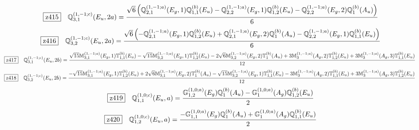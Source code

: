 \documentclass[fleqn,10pt,landscape]{jsarticle}
\begin{document}
\begin{dmath*}
\hspace*{3mm}\fbox{z415}\quad \mathbb{Q}_{3,1}^{(1,-1;c)}(E_{u},2a)=\frac{\sqrt{6} \left(\mathbb{Q}_{2,1}^{(1,-1;a)}(E_{g},1) \mathbb{Q}_{1,1}^{(b)}(E_{u}) - \mathbb{Q}_{2,2}^{(1,-1;a)}(E_{g},1) \mathbb{Q}_{1,2}^{(b)}(E_{u}) - \mathbb{Q}_{2,2}^{(1,-1;a)}(E_{g},2) \mathbb{Q}_{1}^{(b)}(A_{u})\right)}{6}
\end{dmath*}
\begin{dmath*}
\hspace*{3mm}\fbox{z416}\quad \mathbb{Q}_{3,2}^{(1,-1;c)}(E_{u},2a)=\frac{\sqrt{6} \left(- \mathbb{Q}_{2,1}^{(1,-1;a)}(E_{g},1) \mathbb{Q}_{1,2}^{(b)}(E_{u}) + \mathbb{Q}_{2,1}^{(1,-1;a)}(E_{g},2) \mathbb{Q}_{1}^{(b)}(A_{u}) - \mathbb{Q}_{2,2}^{(1,-1;a)}(E_{g},1) \mathbb{Q}_{1,1}^{(b)}(E_{u})\right)}{6}
\end{dmath*}
\begin{dmath*}
\hspace*{3mm}\fbox{z417}\quad \mathbb{Q}_{3,1}^{(1,-1;c)}(E_{u},2b)=\frac{\sqrt{15} \mathbb{M}_{3,1}^{(1,-1;a)}(E_{g},1) \mathbb{T}_{1,1}^{(b)}(E_{u}) - \sqrt{15} \mathbb{M}_{3,2}^{(1,-1;a)}(E_{g},1) \mathbb{T}_{1,2}^{(b)}(E_{u}) - 2 \sqrt{6} \mathbb{M}_{3,2}^{(1,-1;a)}(E_{g},2) \mathbb{T}_{1}^{(b)}(A_{u}) + 3 \mathbb{M}_{3}^{(1,-1;a)}(A_{g},2) \mathbb{T}_{1,2}^{(b)}(E_{u}) + 3 \mathbb{M}_{3}^{(1,-1;a)}(A_{g},3) \mathbb{T}_{1,1}^{(b)}(E_{u})}{12}
\end{dmath*}
\begin{dmath*}
\hspace*{3mm}\fbox{z418}\quad \mathbb{Q}_{3,2}^{(1,-1;c)}(E_{u},2b)=\frac{- \sqrt{15} \mathbb{M}_{3,1}^{(1,-1;a)}(E_{g},1) \mathbb{T}_{1,2}^{(b)}(E_{u}) + 2 \sqrt{6} \mathbb{M}_{3,1}^{(1,-1;a)}(E_{g},2) \mathbb{T}_{1}^{(b)}(A_{u}) - \sqrt{15} \mathbb{M}_{3,2}^{(1,-1;a)}(E_{g},1) \mathbb{T}_{1,1}^{(b)}(E_{u}) - 3 \mathbb{M}_{3}^{(1,-1;a)}(A_{g},2) \mathbb{T}_{1,1}^{(b)}(E_{u}) + 3 \mathbb{M}_{3}^{(1,-1;a)}(A_{g},3) \mathbb{T}_{1,2}^{(b)}(E_{u})}{12}
\end{dmath*}
\begin{dmath*}
\hspace*{3mm}\fbox{z419}\quad \mathbb{Q}_{1,1}^{(1,0;c)}(E_{u},a)=\frac{\mathbb{G}_{1,2}^{(1,0;a)}(E_{g}) \mathbb{Q}_{1}^{(b)}(A_{u}) - \mathbb{G}_{1}^{(1,0;a)}(A_{g}) \mathbb{Q}_{1,2}^{(b)}(E_{u})}{2}
\end{dmath*}
\begin{dmath*}
\hspace*{3mm}\fbox{z420}\quad \mathbb{Q}_{1,2}^{(1,0;c)}(E_{u},a)=\frac{- \mathbb{G}_{1,1}^{(1,0;a)}(E_{g}) \mathbb{Q}_{1}^{(b)}(A_{u}) + \mathbb{G}_{1}^{(1,0;a)}(A_{g}) \mathbb{Q}_{1,1}^{(b)}(E_{u})}{2}
\end{dmath*}
\end{document}
